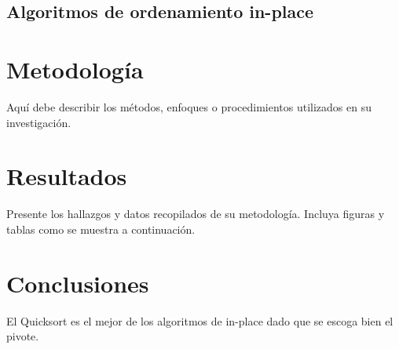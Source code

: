 \documentclass[conference]{IEEEtran}
\begin{document}
\subsection{Algoritmos de ordenamiento in-place}

\section{Metodología}
Aquí debe describir los métodos, enfoques o procedimientos utilizados en su investigación.

\section{Resultados}
Presente los hallazgos y datos recopilados de su metodología. Incluya figuras y tablas como se muestra a continuación.


\section{Conclusiones}
El Quicksort es el mejor de los algoritmos de in-place dado que se escoga bien el pivote.




\end{document}
